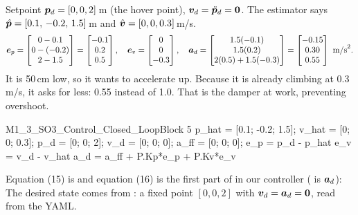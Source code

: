 \begin{toy}
Setpoint $\bm{p}_d=[0,0,2]$\,m (the  hover point), $\bm{v}_d=\ddot{\bm{p}}_d=\bm0$. The estimator says
$\hat{\bm p}=[0.1,\,-0.2,\,1.5]$\,m and $\hat{\bm v}=[0,0,0.3]$\,m/s.
\[
\bm{e}_p=\begin{bmatrix}0-0.1\\0-(-0.2)\\2-1.5\end{bmatrix}=\begin{bmatrix}-0.1\\0.2\\0.5\end{bmatrix},\quad
\bm{e}_v=\begin{bmatrix}0\\0\\-0.3\end{bmatrix},\quad
\bm{a}_d=\begin{bmatrix}1.5(-0.1)\\1.5(0.2)\\2(0.5)+1.5(-0.3)\end{bmatrix}=\begin{bmatrix}-0.15\\0.30\\0.55\end{bmatrix}\text{ m/s}^2 .
\]
It is 50\,cm low, so it wants to accelerate up. Because it is already climbing at 0.3\,m/s, it asks for less: 0.55
instead of 1.0. That is the damper at work, preventing overshoot.
\end{toy}

\begin{toycode}{M1\_3\_SO3\_Control\_Closed\_Loop}{Block 5}
p_hat = [0.1; -0.2; 1.5];   v_hat = [0; 0; 0.3];
p_d   = [0; 0; 2];          v_d = [0; 0; 0];     a_ff = [0; 0; 0];
e_p = p_d - p_hat
e_v = v_d - v_hat
a_d = a_ff + P.Kp*e_p + P.Kv*e_v
\end{toycode}

\begin{real}
Equation (15) is  and equation (16) is the first part of
 in our controller ( is $\bm{a}_d$):
The desired state comes from : a fixed point $[0,0,2]$ with $\bm{v}_d=\bm{a}_d=\bm0$, read from the YAML.
\end{real}

